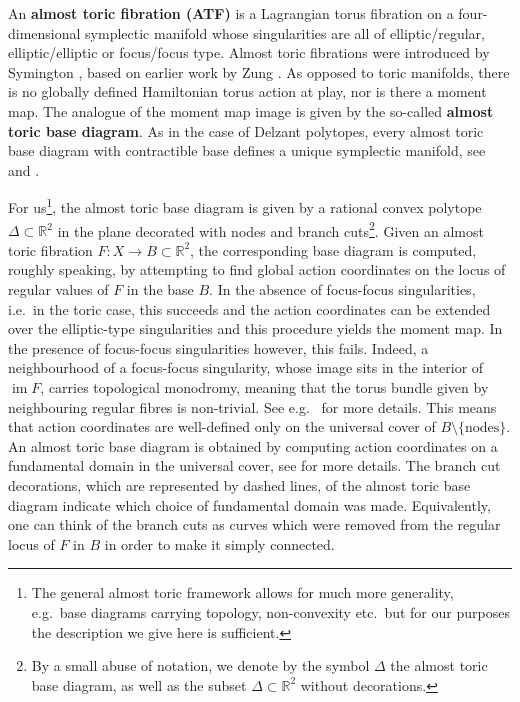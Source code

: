 \documentclass[12pt,a4paper,abstract=true,final]{scrartcl}
\DeclareMathOperator{\im}{im}
\begin{document}
An \textbf{almost toric fibration (ATF)} is a Lagrangian torus fibration on a four-dimensional symplectic manifold whose singularities are all of elliptic\-/regular, elliptic\-/elliptic or focus\-/focus type.
Almost toric fibrations were introduced by Sy\-ming\-ton \cite{symington2002FourDF}, based on earlier work by Zung \cite{Zun96,Zun97,Zun03}.
As opposed to toric manifolds, there is no globally defined Hamiltonian torus action at play, nor is there a moment map.
The analogue of the moment map image is given by the so-called \textbf{almost toric base diagram}.
As in the case of Delzant polytopes, every almost toric base diagram with contractible base defines a unique symplectic manifold, see \cite[Corollary 5.4]{symington2002FourDF} and \cite[Theorem 8.5]{evans2021atfs}. 

For us\footnote{The general almost toric framework allows for much more generality, e.g.\ base diagrams carrying topology, non-convexity etc.\, but for our purposes the description we give here is sufficient.}, the almost toric base diagram is given by a rational convex polytope $\Delta \subset \mathbb{R}^2$ in the plane decorated with nodes and branch cuts\footnote{By a small abuse of notation, we denote by the symbol $\Delta$ the almost toric base diagram, as well as the subset $\Delta \subset \mathbb{R}^2$ without decorations.}.
Given an almost toric fibration $F \colon X \rightarrow B \subset \mathbb{R}^2$, the corresponding base diagram is computed, roughly speaking, by attempting to find global action coordinates on the locus of regular values of $F$ in the base $B$.
In the absence of focus-focus singularities, i.e.\ in the toric case, this succeeds and the action coordinates can be extended over the elliptic-type singularities and this procedure yields the moment map.
In the presence of focus-focus singularities however, this fails.
Indeed, a neighbourhood of a focus-focus singularity, whose image sits in the interior of $\im F$, carries topological monodromy, meaning that the torus bundle given by neighbouring regular fibres is non-trivial.
See e.g.\ \cite{Zun97} for more details.
This means that action coordinates are well-defined only on the universal cover of $B \setminus \{\text{nodes}\}$.
An almost toric base diagram is obtained by computing action coordinates on a fundamental domain in the universal cover, see \cite[Definition 8.3]{evans2021atfs} for more details.
The branch cut decorations, which are represented by dashed lines, of the almost toric base diagram indicate which choice of fundamental domain was made.
Equivalently, one can think of the branch cuts as curves which were removed from the regular locus of $F$ in $B$ in order to make it simply connected.
\end{document}
